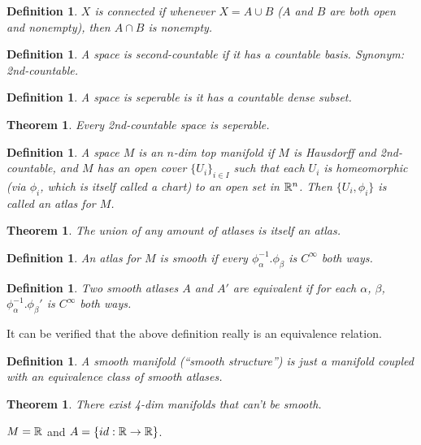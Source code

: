 \documentclass[11pt,leqno,oneside]{amsart}
\newcommand{\de}{\emph}
\theoremstyle{mystyle} \newtheorem{thrm}[thm]{Theorem}
\theoremstyle{mystyle} \newtheorem{defi}[thm]{Definition}
\begin{document}
\begin{defi}
	$X$ is \de{connected} if whenever $X = A \cup B$ ($A$ and $B$ are both open and nonempty), then $A \cap B$ is nonempty.
\end{defi}

\begin{defi}
	A space is \de{second-countable} if it has a countable basis.  Synonym: \de{2nd-countable}.
\end{defi}
\begin{defi}
	A space is \de{seperable} is it has a countable dense subset.
\end{defi}
\begin{thrm}
	Every 2nd-countable space is seperable.
\end{thrm}
\begin{defi}
	A space $M$ is an $n$-dim top \de{manifold} if $M$ is Hausdorff and 2nd-countable, and $M$ has an open cover $\{U_i\}_{i \in I}$ such that each $U_i$ is homeomorphic (via $\phi_i$, which is itself called a \de{chart}) to an open set in ${\mathbb R}^n$.  Then $\{ U_i, \phi_i \}$ is called an \de{atlas} for $M$.
\end{defi}
\begin{thrm}
	The union of any amount of atlases is itself an atlas.
\end{thrm}

\begin{defi}
	An atlas for $M$ is \de{smooth} if every $\phi_\alpha^{-1}.\phi_\beta$ is $C^\infty$ both ways.
\end{defi}

\begin{defi}
	Two smooth atlases $A$ and $A'$ are \de{equivalent} if for each $\alpha$, $\beta$, $\phi_\alpha^{-1}.\phi_\beta'$ is $C^\infty$ both ways.
\end{defi}
\begin{rmk}
	It can be verified that the above definition really is an equivalence relation.
\end{rmk}

\begin{defi}
	A \de{smooth} manifold (``smooth structure'') is just a manifold coupled with an equivalence class of smooth atlases.
\end{defi}

\begin{thrm}
	There exist 4-dim manifolds that can't be smooth.
\end{thrm}



\begin{example}
	$M = {\mathbb R}$ and $A = \{ id: {\mathbb R} \to {\mathbb R} \}$.
\end{example}
\end{document}
